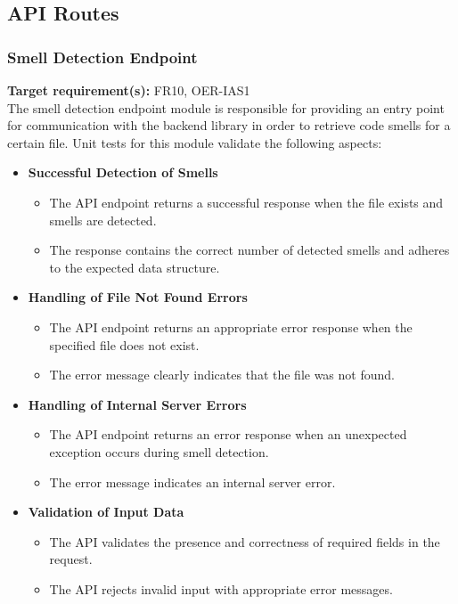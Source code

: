 \documentclass[12pt, titlepage]{article}
\begin{document}
\subsection{API Routes}

\subsubsection{Smell Detection Endpoint}

\textbf{Target requirement(s):} FR10, OER-IAS1~\cite{SRS} \\

\noindent
The smell detection endpoint module is responsible for providing an entry point for communication with the backend library in order to retrieve code smells for a certain file. Unit tests for this module validate the following aspects:

\begin{itemize}
  \item \textbf{Successful Detection of Smells}
  \begin{itemize}
    \item The API endpoint returns a successful response when the file exists and smells are detected.
    \item The response contains the correct number of detected smells and adheres to the expected data structure.
  \end{itemize}

  \item \textbf{Handling of File Not Found Errors}
  \begin{itemize}
      \item The API endpoint returns an appropriate error response when the specified file does not exist.
      \item The error message clearly indicates that the file was not found.
  \end{itemize}

  \item \textbf{Handling of Internal Server Errors}
  \begin{itemize}
      \item The API endpoint returns an error response when an unexpected exception occurs during smell detection.
      \item The error message indicates an internal server error.
  \end{itemize}

  \item \textbf{Validation of Input Data}
  \begin{itemize}
      \item The API validates the presence and correctness of required fields in the request.
      \item The API rejects invalid input with appropriate error messages.
  \end{itemize}

\end{itemize}
\end{document}
